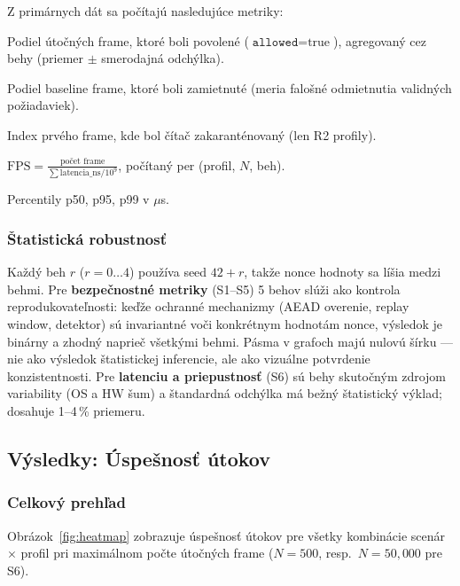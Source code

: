 Z primárnych dát sa počítajú nasledujúce metriky:

\begin{description}[leftmargin=*,itemsep=2pt]
  \item[Attack success rate:] Podiel útočných frame, ktoré boli povolené ($\texttt{allowed} = \text{true}$), agregovaný cez behy (priemer $\pm$ smerodajná odchýlka).
  \item[False reject rate:] Podiel baseline frame, ktoré boli zamietnuté (meria falošné odmietnutia validných požiadaviek).
  \item[Time to quarantine:] Index prvého frame, kde bol čítač zakaranténovaný (len R2 profily).
  \item[Throughput:] $\text{FPS} = \frac{\text{počet frame}}{\sum \text{latencia\_ns} / 10^9}$, počítaný per (profil, $N$, beh).
  \item[Latencia:] Percentily p50, p95, p99 v $\mu$s.
\end{description}

\subsubsection{Štatistická robustnosť}

Každý beh $r$ ($r = 0\ldots4$) používa seed $42 + r$, takže nonce hodnoty sa líšia medzi behmi. Pre \textbf{bezpečnostné metriky} (S1--S5) 5 behov slúži ako kontrola reprodukovateľnosti: keďže ochranné mechanizmy (AEAD overenie, replay window, detektor) sú invariantné voči konkrétnym hodnotám nonce, výsledok je binárny a zhodný naprieč všetkými behmi. Pásma v grafoch majú nulovú šírku --- nie ako výsledok štatistickej inferencie, ale ako vizuálne potvrdenie konzistentnosti. Pre \textbf{latenciu a priepustnosť} (S6) sú behy skutočným zdrojom variability (OS a HW šum) a štandardná odchýlka má bežný štatistický výklad; dosahuje 1--4\,\% priemeru.

\subsection{Výsledky: Úspešnosť útokov}
\label{sec:results_attacks}

\subsubsection{Celkový prehľad}

Obrázok~\ref{fig:heatmap} zobrazuje úspešnosť útokov pre všetky kombinácie scenár $\times$ profil pri maximálnom počte útočných frame ($N=500$, resp.\ $N=50{,}000$ pre S6).

